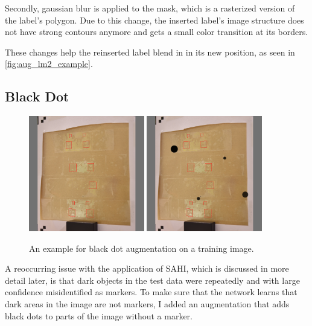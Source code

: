 \documentclass[10pt]{book}
\newcommand{\figureref}[1]{\autoref{#1}}
\begin{document}
Secondly, gaussian blur is applied to the mask, which is a rasterized version of the label's polygon. Due to this change, the inserted label's image structure does not have strong contours anymore and gets a small color transition at its borders.

These changes help the reinserted label blend in in its new position, as seen in \figureref{fig:aug_lm2_example}.

\subsection{Black Dot}

\begin{figure}
  \centering
     {\includegraphics[width=0.45\textwidth]{image/aug_bd_before}}
     {\includegraphics[width=0.45\textwidth]{image/aug_bd_after}}
  \caption{An example for black dot augmentation on a training image.}
  \label{fig:aug_bd_example}
\end{figure}

A reoccurring issue with the application of \ac{SAHI}, which is discussed in more detail later, is that dark objects in the test data were repeatedly and with large confidence misidentified as markers. To make sure that the network learns that dark areas in the image are not markers, I added an augmentation that adds black dots to parts of the image without a marker. 
\end{document}
